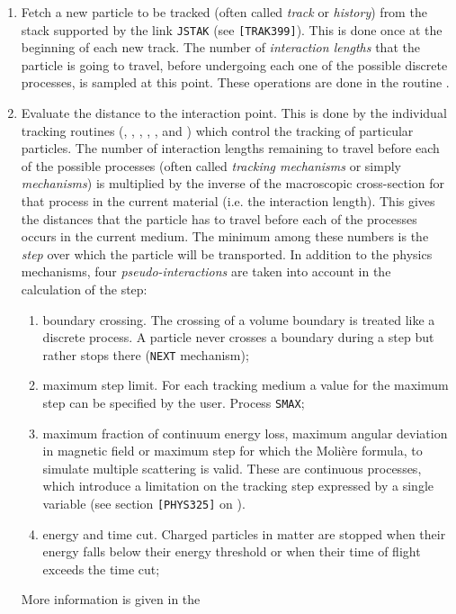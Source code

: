 \begin{enumerate}
\item Fetch a new particle to be tracked (often called {\it track} or
{\it history}) from the stack supported by the link {\tt JSTAK} (see 
{\tt [TRAK399]}). This is done once at the beginning of each new track. 
The number of {\it interaction lengths} that the particle is going to 
travel, before undergoing each one of the possible discrete processes, 
is sampled at this point. These operations are done in the routine 
.
\item Evaluate the distance to the interaction point.
This is done by the individual tracking routines
(, , , ,
,  and ) which control the 
tracking of particular particles.
The number of interaction lengths remaining to travel
before each of the
possible processes (often called {\it tracking mechanisms} or simply
{\it mechanisms}) is multiplied
by the inverse of the macroscopic cross-section
for that process in the current material (i.e. the interaction
length). This gives the distances that the particle has to travel before
each of the processes occurs in the current medium. 
The minimum among these numbers is the
{\it step} over which the particle will be transported. In addition to
the physics mechanisms, four
{\it pseudo-interactions} are taken into account in the calculation of
the step:
\begin{enumerate}
\item boundary crossing. The crossing of a volume boundary is treated
like a discrete process. A particle never crosses a boundary
during a step but rather stops there ({\tt NEXT} mechanism);
\item maximum step limit. For each tracking medium a value for the
maximum step can be specified by the user. Process {\tt SMAX};
\item maximum fraction of continuum energy loss, maximum angular
deviation in magnetic
field or maximum step for which the Moli\`ere formula, to simulate
multiple scattering is valid. These are continuous processes,
which introduce a limitation on the tracking step expressed by a
single variable (see section {\tt [PHYS325]} on ).
\item energy and time cut. Charged particles in matter are stopped when their
energy falls below their energy threshold or when their time of flight
exceeds the time cut;
\end{enumerate}
More information is given in the

\end{enumerate}
